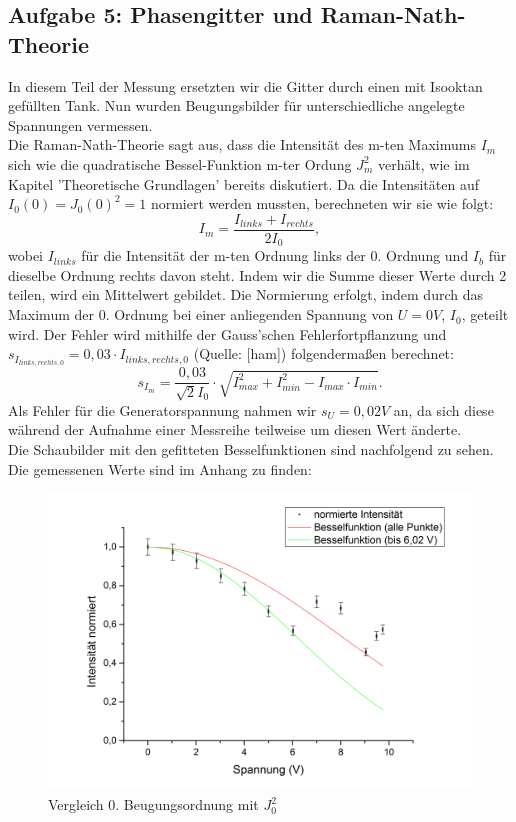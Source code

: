 \subsection{Aufgabe 5: Phasengitter und Raman-Nath-Theorie}
In diesem Teil der Messung ersetzten wir die Gitter durch einen mit Isooktan gefüllten Tank. Nun wurden Beugungsbilder für unterschiedliche angelegte Spannungen vermessen. \\
Die Raman-Nath-Theorie sagt aus, dass die Intensität des m-ten Maximums $I_{m}$ sich wie die quadratische Bessel-Funktion m-ter Ordung $J_{m}^{2}$ verhält, wie im Kapitel 'Theoretische Grundlagen' bereits diskutiert. Da die Intensitäten auf $I_{0}(0)=J_{0}(0)^{2}=1$ normiert werden mussten, berechneten wir sie wie folgt: \[I_{m}=\frac{I_{links}+I_{rechts}}{2I_{0}},\]wobei $I_{links}$ für die Intensität der m-ten Ordnung links der 0. Ordnung und $I_{b}$ für dieselbe Ordnung rechts davon steht. Indem wir die Summe dieser Werte durch 2 teilen, wird ein Mittelwert gebildet. Die Normierung erfolgt, indem durch das Maximum der 0. Ordnung bei einer anliegenden Spannung von $U=0V$, $I_{0}$, geteilt wird. Der Fehler wird mithilfe der Gauss'schen Fehlerfortpflanzung und $s_{I_{links,rechts,0}}=0,03\cdot I_{links,rechts,0}$ (Quelle: [ham]) folgendermaßen berechnet: \[s_{I_{m}}=\frac{0,03}{\sqrt{2}I_{0}}\cdot\sqrt{I_{max}^{2}+I_{min}^{2}-I_{max}\cdot I_{min}}.\] Als Fehler für die Generatorspannung nahmen wir $s_{U}=0,02V$ an, da sich diese während der Aufnahme einer Messreihe teilweise um diesen Wert änderte.\\
Die Schaubilder mit den gefitteten Besselfunktionen sind nachfolgend zu sehen. Die gemessenen Werte sind im Anhang zu finden:\\
\begin{center}
\begin{figure}[htbp]
\includegraphics[scale=0.5]{Bilder/bessli0}
\caption{Vergleich 0. Beugungsordnung mit $J_{0}^{2}$}
\end{figure}
\end{center}
